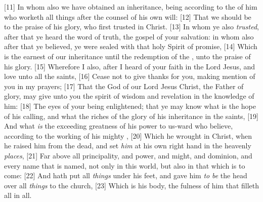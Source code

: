 [11] \textcolor[cmyk]{0.99998,1,0,0}{In whom also we have obtained an inheritance, being  according to the  of him who worketh all things after the counsel of his own will:}
[12] \textcolor[cmyk]{0.99998,1,0,0}{That we should be to the praise of his glory, who first trusted in Christ.}
[13] \textcolor[cmyk]{0.99998,1,0,0}{In whom ye also \emph{trusted}, after that ye heard the word of truth, the gospel of your salvation: in whom also after that ye believed, ye were sealed with that holy Spirit of promise,}
[14] \textcolor[cmyk]{0.99998,1,0,0}{Which is the earnest of our inheritance until the redemption of the  , unto the praise of his glory.}
[15] \textcolor[cmyk]{0.99998,1,0,0}{Wherefore I also, after I heard of your faith in the Lord Jesus, and love unto all the saints,}
[16] \textcolor[cmyk]{0.99998,1,0,0}{Cease not to give thanks for you, making mention of you in my prayers;}
[17] \textcolor[cmyk]{0.99998,1,0,0}{That the God of our Lord Jesus Christ, the Father of glory, may give unto you the spirit of wisdom and revelation in the knowledge of him:}
[18] \textcolor[cmyk]{0.99998,1,0,0}{The eyes of your  being enlightened; that ye may know what is the hope of his calling, and what the riches of the glory of his inheritance in the saints,}
[19] \textcolor[cmyk]{0.99998,1,0,0}{And what \emph{is} the exceeding greatness of his power to us-ward who believe, according to the working of his mighty ,}
[20] \textcolor[cmyk]{0.99998,1,0,0}{Which he wrought in Christ, when he raised him from the dead, and set \emph{him} at his own right hand in the heavenly \emph{places},}
[21] \textcolor[cmyk]{0.99998,1,0,0}{Far above all principality, and power, and might, and dominion, and every name that is named, not only in this world, but also in that which is to come:}
[22] \textcolor[cmyk]{0.99998,1,0,0}{And hath put all \emph{things} under his feet, and gave him \emph{to} \emph{be} the head over all \emph{things} to the church,}
[23] \textcolor[cmyk]{0.99998,1,0,0}{Which is his body, the fulness of him that filleth all in all.}




